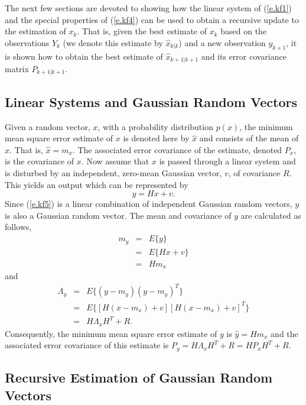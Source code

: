 	The next few sections are devoted to showing how
the linear system of (\ref{e.kf1}) and the special properties
of (\ref{e.kf4}) can be used to obtain a recursive update to the
estimation of $x_k$.  That is, given the best estimate of $x_k$
based on the observations $Y_k$ (we denote this estimate by 
$\hat{x}_{k|k}$) and a new observation $y_{k+1}$, it is shown
how to obtain the best estimate of $\hat{x}_{k+1|k+1}$ and its
error covariance matrix $P_{k+1|k+1}$.

\subsection{Linear Systems and Gaussian Random Vectors}

	Given a random vector, $x$, with a probability
distribution $p(x)$, the minimum mean square error estimate of
$x$ is denoted here by $\hat{x}$ and consists of the mean of
$x$.  That is, $\hat{x}=m_x$.
The associated error covariance of the estimate, denoted 
$P_x$, is the covariance of $x$.  Now assume that $x$ is passed 
through a linear system and is disturbed by an independent,
zero-mean Gaussian vector, $v$, of covariance $R$.  This yields an
output which can be represented by
%
\begin{equation}
y=Hx+v.
\label{e.kf5}
\end{equation}
%
Since (\ref{e.kf5}) is a linear combination of independent
Gaussian random vectors, $y$ is also a Gaussian random
vector.  The mean and covariance of $y$ are calculated
as follows,
%
\begin{eqnarray}
m_y&=&E\{y\}\nonumber\\
   &=&E\{Hx+v\}\nonumber\\
   &=&Hm_x    
\label{e.kf6}
\end{eqnarray}
%
and
%
\begin{eqnarray}
\Lambda_y&=&E\{(y-m_y)(y-m_y)^T\}\nonumber\\
   &=&E\{[H(x-m_x)+v][H(x-m_x)+v]^T\}\nonumber\\
   &=&H\Lambda_xH^T+R.
\label{e.kf7}
\end{eqnarray}
%
Consequently, the minimum mean square error estimate of $y$
is $\hat{y}=Hm_x$ and the associated error covariance of this
estimate is $P_y=H\Lambda_xH^T+R=HP_xH^T+R$.

\subsection{Recursive Estimation of Gaussian Random Vectors}

